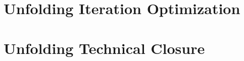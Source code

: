 \documentclass{report}
\begin{document}
\section{Unfolding Iteration Optimization}

\clearpage
\section{Unfolding Technical Closure}



%

\end{document}
